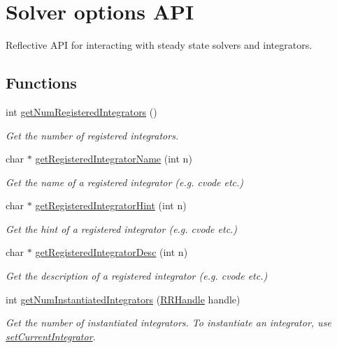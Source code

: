 \hypertarget{group__simopts}{\section{Solver options A\+P\+I}
\label{group__simopts}
}


Reflective A\+P\+I for interacting with steady state solvers and integrators.  


\subsection*{Functions}
\begin{DoxyCompactItemize}
\item 
int \hyperlink{group__simopts_ga53617fbabff8088e10c8bc5deee40353}{get\+Num\+Registered\+Integrators} ()
\begin{DoxyCompactList}\small\item\em Get the number of registered integrators. \end{DoxyCompactList}\item 
char $\ast$ \hyperlink{group__simopts_ga5713f7cea279fc58aa497615ebb7ddbf}{get\+Registered\+Integrator\+Name} (int n)
\begin{DoxyCompactList}\small\item\em Get the name of a registered integrator (e.\+g. cvode etc.) \end{DoxyCompactList}\item 
char $\ast$ \hyperlink{group__simopts_ga6d22f11e49e89336e5d795e620e55530}{get\+Registered\+Integrator\+Hint} (int n)
\begin{DoxyCompactList}\small\item\em Get the hint of a registered integrator (e.\+g. cvode etc.) \end{DoxyCompactList}\item 
char $\ast$ \hyperlink{group__simopts_gaae54354d9935875691727e0b89e5ebc2}{get\+Registered\+Integrator\+Desc} (int n)
\begin{DoxyCompactList}\small\item\em Get the description of a registered integrator (e.\+g. cvode etc.) \end{DoxyCompactList}\item 
int \hyperlink{group__simopts_ga492555873a0da5f8aa167eeafb7d7d21}{get\+Num\+Instantiated\+Integrators} (\hyperlink{rrc__types_8h_a1d68f0592372208fa5a5f2799ea4b3ae}{R\+R\+Handle} handle)
\begin{DoxyCompactList}\small\item\em Get the number of instantiated integrators.  To instantiate an integrator, use \hyperlink{group__simopts_ga7d4664a6a66a2a9b224db95b751127fe}{set\+Current\+Integrator}. \end{DoxyCompactList}\item 

\end{DoxyCompactItemize}
